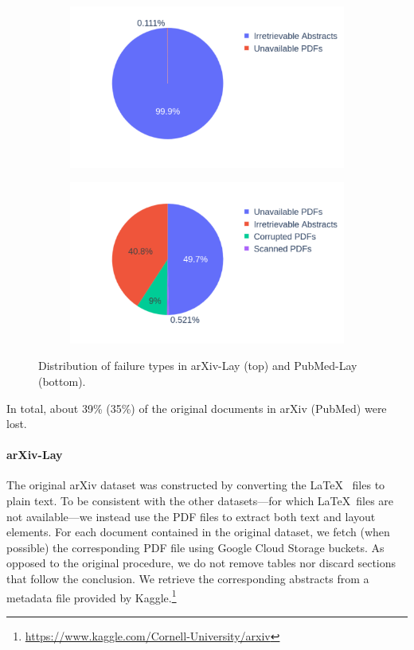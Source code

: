 \begin{figure}[H]
    \centering
  \begin{subfigure}[b]{0.45\textwidth}
    \includegraphics[width=\textwidth]{images/chapter5/distribution_failure_types_arxiv.pdf}
  \end{subfigure}
  \begin{subfigure}[b]{0.45\textwidth}
    \includegraphics[width=\textwidth]{images/chapter5/distribution_failure_types_pubmed.pdf}
  \end{subfigure}
\caption{Distribution of failure types in arXiv-Lay (top) and PubMed-Lay (bottom).}
\label{fig:details-lost-docs}
\end{figure}

In total, about 39\% (35\%) of the original documents in arXiv (PubMed) were lost.

\paragraph{arXiv-Lay}

The original arXiv dataset \citep{cohan2018discourse} was constructed by converting the \LaTeX~ files to plain text. To be consistent with the other datasets—for which \LaTeX~files are not available—we instead use the PDF files to extract both text and layout elements. For each document contained in the original dataset, we fetch (when possible) the corresponding PDF file using Google Cloud Storage buckets. As opposed to the original procedure, we do not remove tables nor discard sections that follow the conclusion. We retrieve the corresponding abstracts from a metadata file provided by Kaggle.\footnote{\url{https://www.kaggle.com/Cornell-University/arxiv}}

